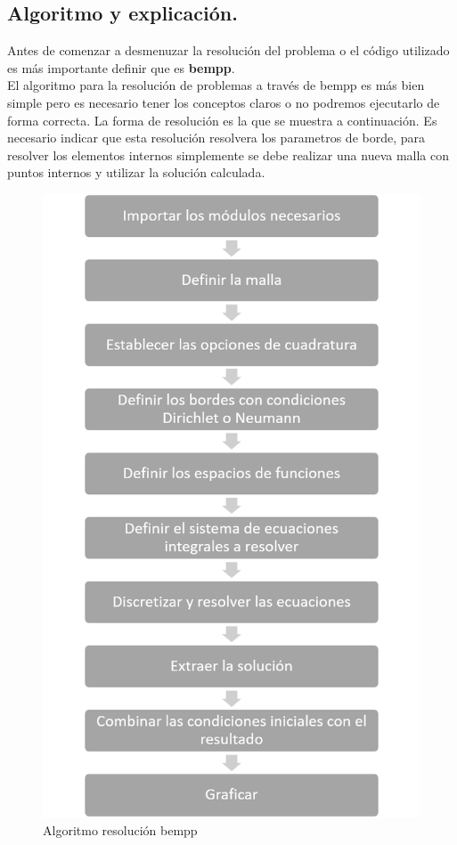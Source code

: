 \documentclass[11pt]{article}
\begin{document}
\subsection{Algoritmo y explicación.}
Antes de comenzar a desmenuzar la resolución del problema o el código utilizado es más importante definir que es \textbf{bempp}\cite{bempp}.\\
 El algoritmo para la resolución de problemas a través de bempp es más bien simple pero es necesario tener los conceptos claros o no podremos ejecutarlo de forma correcta. La forma de resolución es la que se muestra a continuación. Es necesario indicar que esta resolución resolvera los parametros de borde, para resolver los elementos internos simplemente se debe realizar una nueva malla con puntos internos y utilizar la solución calculada.
 \begin{figure}[H]
 \centering
 \includegraphics[scale=0.75]{Imagenes/Algoritmo bempp.png}
 \caption{Algoritmo resolución bempp}\label{fig:Algoritmo de BEM}
 \end{figure}
\end{document}
